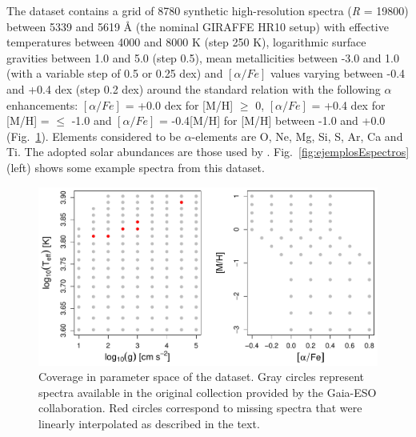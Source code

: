 \documentclass[a4paper,fleqn,usenatbib]{mnras}
\begin{document}
The dataset contains a grid of 8780 synthetic high-resolution spectra 
(\textit{R} = 19800) between 5339 and 5619 {\AA} (the nominal GIRAFFE 
HR10 setup) with effective temperatures between 4000 and 
8000 K (step 250 K), logarithmic surface gravities between 1.0 and 5.0 
(step 0.5), mean metallicities between -3.0 and 1.0 (with a variable step 
of 0.5 or 0.25 dex) and $\left[ \alpha/Fe \right]$ values varying between
-0.4 and +0.4 dex (step 0.2 dex) around the standard relation with the
following $\alpha$ enhancements: $\left[ \alpha/Fe \right]$ = +0.0 dex
for [M/H] $\geqslant$ 0, $\left[ \alpha/Fe \right]$ = +0.4 dex for
[M/H] = $\leqslant$ -1.0 and $\left[ \alpha/Fe \right]$ = -0.4[M/H]
for [M/H] between -1.0 and +0.0 (Fig.~\ref{fig:gridModelos}).
Elements considered to be $\alpha$-elements are O, Ne, Mg, Si, S, Ar,
Ca and Ti. The adopted solar abundances are those used by
\citep{gustafsson:08}. Fig.~\ref{fig:ejemplosEspectros} (left) shows some
example spectra from this dataset.   

\begin{figure}
	\centering\includegraphics[width=\columnwidth]{fig01_grid_modelos.pdf}
	\caption{Coverage in parameter space of the dataset. Gray circles 
		represent spectra available in the original collection provided 
		by the Gaia-ESO collaboration. Red circles correspond to missing 
		spectra that were linearly interpolated as described in the text.}
	\label{fig:gridModelos}
\end{figure}
\end{document}
